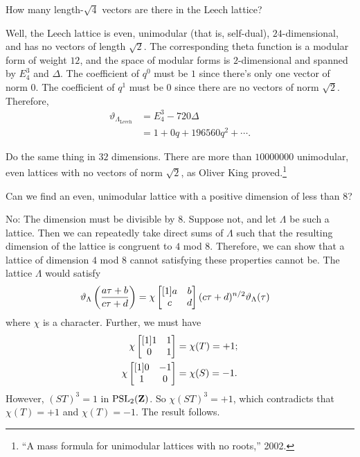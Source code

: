 \documentclass[11pt, oneside,margin=1in]{article}
\begin{document}
\begin{problem}
	How many length-$\sqrt{4} $ vectors are there in the Leech lattice?
\end{problem}

Well, the Leech lattice is even, unimodular (that is, self-dual), $24$-dimensional, and has no vectors of length $\sqrt{2} $. The corresponding theta function is a modular form of weight $12$, and the space of modular forms is $2$-dimensional and spanned by $E_4^3$ and $\Delta$. The coefficient of $q^0$ must be $1$ since there's only one vector of norm $0$. The coefficient of $q^1$ must be $0$ since there are no vectors of norm $\sqrt{2} $. Therefore,
\begin{align*}
	\vartheta _{\Lambda_{\textrm{Leech}}} &= E_4^3 - 720\Delta\\
			       &= 1 + 0q + 196560q^2 + \cdots.
\end{align*}

\begin{exercise}\label{}\text{}
Do the same thing in $32$ dimensions. There are more than $10000000$ unimodular, even lattices with no vectors of norm $\sqrt{2} $, as Oliver King proved.\footnote{``A mass formula for unimodular lattices with no roots,'' 2002.}
\end{exercise}

\begin{problem}
	Can we find an even, unimodular lattice with a positive dimension of less than $8$?
\end{problem}

No: The dimension must be divisible by $8$. Suppose not, and let $\Lambda$ be such a lattice. Then we can repeatedly take direct sums of $\Lambda$ such that the resulting dimension of the lattice is congruent to $4$ mod $8$. Therefore, we can show that a lattice of dimension $4$ mod $8$ cannot satisfying these properties cannot be. The lattice $\Lambda$ would satisfy
\begin{align*}
	\vartheta_{\Lambda } \left( \frac{a\tau + b}{c\tau + d} \right) &= \chi \begin{bmatrix} [1] a&b\\c&d\end{bmatrix} (c\tau + d)^{n/2} \vartheta_{\Lambda } (\tau)
\end{align*}
where $\chi$ is a character. Further, we must have
\begin{align*}
	\chi \begin{bmatrix} [1] 1&1\\0&1\end{bmatrix} &= \chi(T) = +1;\\
	\chi\begin{bmatrix} [1] 0&-1\\1&0\end{bmatrix} &=\chi(S) = -1.
\end{align*}
However, $(ST)^3 = 1$ in $\operatorname{PSL}_{2}(\mathbf Z)$. So $\chi(ST)^3 =+1$, which contradicts that $\chi(T)=+1$ and $\chi(T)=-1$. The result follows. 
\end{document}
